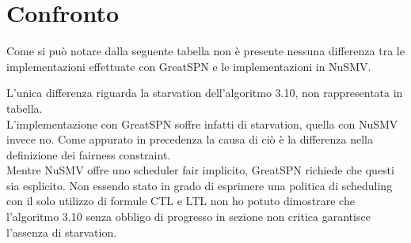 \documentclass[a4paper]{article}
\begin{document}
\section{Confronto}
Come si può notare dalla seguente tabella non è presente nessuna differenza tra le implementazioni effettuate con GreatSPN e le implementazioni in NuSMV.
\begin{center}
\end{center}
L'unica differenza riguarda la starvation dell'algoritmo 3.10, non rappresentata in tabella.\\
L'implementazione con GreatSPN soffre infatti di starvation, quella con NuSMV invece no. Come appurato in precedenza la causa di ciò è la differenza nella definizione dei fairness constraint.\\
Mentre NuSMV offre uno scheduler fair implicito, GreatSPN richiede che questi sia esplicito.
Non essendo stato in grado di esprimere una politica di scheduling con il solo utilizzo di formule CTL e LTL non ho potuto dimostrare che l'algoritmo 3.10 senza obbligo di progresso in sezione non critica garantisce l'assenza di starvation.
\end{document}
